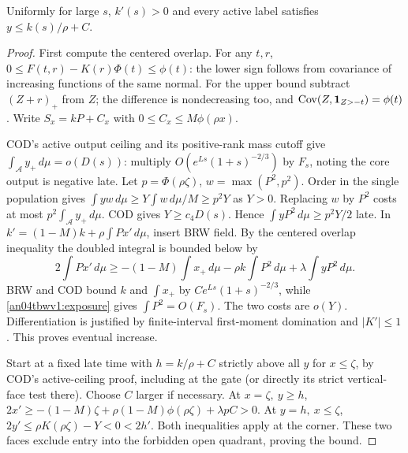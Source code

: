 \documentclass[11pt]{article}
\newcommand{\dd}{\,d}\newcommand{\E}{\mathbb E}
\begin{document}
\begin{lemma}\label{an04tbwv1:sign}
Uniformly for large $s$, $k'(s)>0$ and every active label satisfies
$y\le k(s)/\rho+C$.
\end{lemma}
\begin{proof}
First compute the centered overlap. For any $t,r$,
$0\le F(t,r)-K(r)\Phi(t)\le\phi(t)$: the lower sign follows from
covariance of increasing functions of the same normal. For the
upper bound subtract $(Z+r)_+$ from $Z$; the difference is
nondecreasing too, and $\operatorname{Cov}(Z,{\bf1}_{Z>-t})=\phi(t)$.
Write $S_x=kP+C_x$ with $0\le C_x\le M\phi(\rho x)$.

COD's active output ceiling and its positive-rank mass cutoff give
$\int_{\mathcal A}y_+\dd\mu=o(D(s))$: multiply
$O(e^{Ls}(1+s)^{-2/3})$ by $F_s$, noting the core output is negative
late. Let $p=\Phi(\rho\zeta)$, $w=\max(P^2,p^2)$. Order in the
single population gives $\int yw\dd\mu\ge Y\int w\dd\mu/M\ge p^2Y$
as $Y>0$. Replacing $w$ by $P^2$ costs at most
$p^2\int_{\mathcal A}y_+\dd\mu$. COD gives $Y\ge c_4 D(s)$.
Hence $\int yP^2\dd\mu\ge p^2Y/2$ late. In
$k'=(1-M)k+\rho\int P x'\dd\mu$, insert BRW field. By the
centered overlap inequality the doubled integral is bounded below by
\[
 2\int P x'\dd\mu\ge
 -(1-M)\int x_+\dd\mu-\rho k\int P^2\dd\mu+\lambda\int yP^2\dd\mu.
\]
BRW and COD bound $k$ and $\int x_+$ by
$C e^{Ls}(1+s)^{-2/3}$, while \eqref{an04tbwv1:exposure} gives
$\int P^2=O(F_s)$. The two costs are $o(Y)$.
Differentiation is justified by finite-interval first-moment domination
and $|K'|\le1$. This proves eventual increase.

Start at a fixed late time with $h=k/\rho+C$ strictly above all
$y$ for $x\le\zeta$, by COD's active-ceiling proof, including at
the gate (or directly its strict vertical-face test there).
Choose $C$ larger if necessary. At $x=\zeta,\ y\ge h$,
$2x'\ge-(1-M)\zeta+\rho(1-M)\phi(\rho\zeta)+\lambda p C>0$.
At $y=h,\ x\le\zeta$, $2y'\le\rho K(\rho\zeta)-Y<0<2h'$.
Both inequalities apply at the corner. These two faces exclude
entry into the forbidden open quadrant, proving the bound.
\end{proof}
\end{document}
